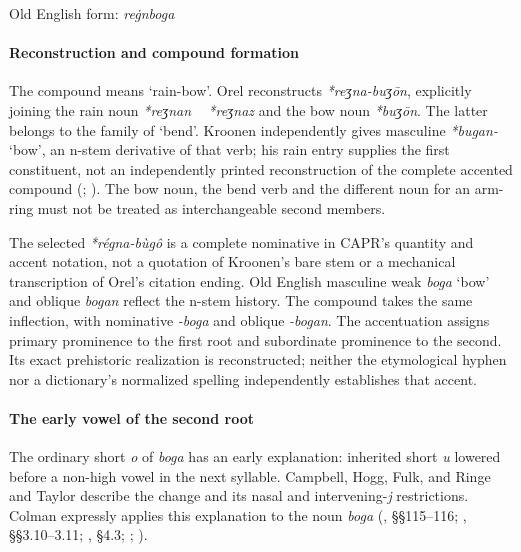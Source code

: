\documentclass[
  british,
  a4paper,
]{article}
\begin{document}
Old English form: \emph{reġnboga}

\paragraph{Reconstruction and compound
formation}\label{reconstruction-and-compound-formation}

The compound means `rain-bow'. Orel reconstructs \emph{*reʒna-buʒōn},
explicitly joining the rain noun \emph{*reʒnan ~ *reʒnaz} and the bow
noun \emph{*buʒōn}. The latter belongs to the family of `bend'. Kroonen
independently gives masculine \emph{*bugan-} `bow', an n-stem derivative
of that verb; his rain entry supplies the first constituent, not an
independently printed reconstruction of the complete accented compound
(;
). The bow
noun, the bend verb and the different noun for an arm-ring must not be
treated as interchangeable second members.

The selected \emph{*régna-bùgô} is a complete nominative in CAPR's
quantity and accent notation, not a quotation of Kroonen's bare stem or
a mechanical transcription of Orel's citation ending. Old English
masculine weak \emph{boga} `bow' and oblique \emph{bogan} reflect the
n-stem history. The compound takes the same inflection, with nominative
\emph{-boga} and oblique \emph{-bogan}. The accentuation assigns primary
prominence to the first root and subordinate prominence to the second.
Its exact prehistoric realization is reconstructed; neither the
etymological hyphen nor a dictionary's normalized spelling independently
establishes that accent.

\paragraph{The early vowel of the second
root}\label{the-early-vowel-of-the-second-root}

The ordinary short \emph{o} of {\emph{boga}} has an early explanation:
inherited short \emph{u} lowered before a non-high vowel in the next
syllable. Campbell, Hogg, Fulk, and Ringe and Taylor describe the change
and its nasal and intervening-\emph{j} restrictions. Colman expressly
applies this explanation to the noun \emph{boga}
(, §§115--116;
, §§3.10--3.11;
, §4.3;
;
).
\end{document}
